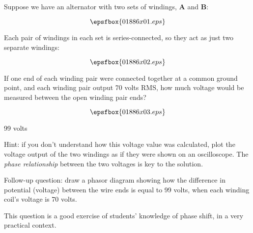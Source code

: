 

Suppose we have an alternator with two sets of windings, {\bf A} and {\bf B}:

$$\epsfbox{01886x01.eps}$$

Each pair of windings in each set is series-connected, so they act as just two separate windings:

$$\epsfbox{01886x02.eps}$$

If one end of each winding pair were connected together at a common ground point, and each winding pair output 70 volts RMS, how much voltage would be measured between the open winding pair ends?

$$\epsfbox{01886x03.eps}$$







99 volts

\vskip 10pt

Hint: if you don't understand how this voltage value was calculated, plot the voltage output of the two windings as if they were shown on an oscilloscope.  The {\it phase relationship} between the two voltages is key to the solution.

\vskip 10pt

Follow-up question: draw a phasor diagram showing how the difference in potential (voltage) between the wire ends is equal to 99 volts, when each winding coil's voltage is 70 volts.







This question is a good exercise of students' knowledge of phase shift, in a very practical context.




